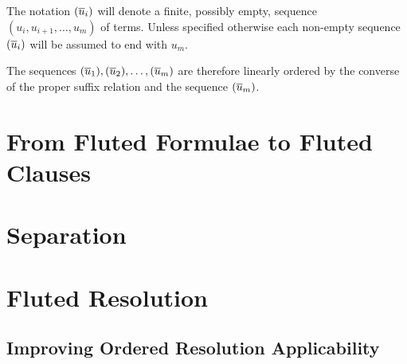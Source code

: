 The notation \(\flseq{i}\) will denote a finite, possibly empty, sequence \((u_i,u_{i+1}, \ldots, u_m)\) of terms. Unless specified otherwise each non-empty sequence \(\flseq{i}\) will be assumed to end with \(u_m\).

The sequences \(\flseq{1},\flseq{2},\ldots,\flseq{m}\) are therefore linearly ordered by the converse of the proper suffix relation and the sequence \(\flseq{m}\).

\section{From Fluted Formulae to Fluted Clauses}
\section{Separation}
\section{Fluted Resolution}
\subsection{Improving Ordered Resolution Applicability}


